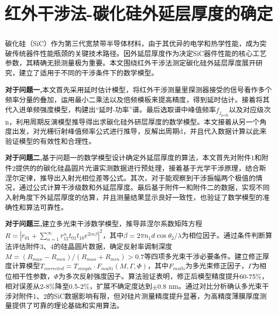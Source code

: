 \documentclass[withoutpreface,bwprint]{cumcmthesis}
\title{红外干涉法-碳化硅外延层厚度的确定}  %
\begin{document}
\maketitle
\begin{abstract}
碳化硅（SiC）作为第三代宽禁带半导体材料，由于其优异的电学和热学性能，成为突破传统器件性能瓶颈的关键技术路径。因外延层厚度作为决定SiC器件性能的核心工艺参数，其精确无损测量极为重要。本文围绕红外干涉法测定碳化硅外延层厚度展开研究，建立了适用于不同的干涉条件下的数学模型。

\textbf{对于问题一,}本文首先采用延时估计模型，将红外干涉测量里探测器接受的信号看作多个频率分量的叠加，运用最小二乘法以及倍频模板来提高精度，得到延时估计。接着将其代入进单频强度模型，构建出“延时-功率”谱。最后选取谱中峰值频率$f_{j_{\mathrm{peak}}}$以及对应级次n，利用周期反演模型推导得出求碳化硅外研层厚度的数学模型。本文接着从另一个角度出发，对光栅衍射峰值频率公式进行推导，反解出周期d，并且代入数据计算以此来验证模型的有效性和合理性。

\textbf{对于问题二,}基于问题一的数学模型设计确定外延层厚度的算法，本文首先对附件1和附件2提供的的碳化硅晶圆片光谱实测数据进行预处理，接着基于光学干涉原理，结合斯涅尔定律，推导出入射光相位差等公式。其次，对于能观察到干涉振幅两个极值的情况，通过公式计算干涉级数和外延层厚度。最后基于附件一和附件二的数据，实现不同入射角度下外延层厚度的估算，并且测量结果显示良好一致性，也验证了数学模型的准确性和算法可靠性。

\textbf{对于问题三,}建立多光束干涉数学模型，推导菲涅尔系数矩阵方程$R = |r_{01} + \sum_{n=1}^{\infty} r_{12}^n t_{01}t_{10} e^{2in\beta}|^2$，其中$\beta = 2\pi n_1 d \cos\theta_2/\lambda$为相位因子。通过条件判断算法评估附件3、4的硅晶圆片数据，确定反射率调制深度$M = (R_{max}-R_{min})/(R_{max}+R_{min}) > 0.7$等四项多光束干涉必要条件。建立修正厚度计算模型$T_{corrected} = T_{simple} \cdot F_{multi}(M, \Gamma, \Phi)$，其中$F_{multi}$为多光束修正因子，$\Gamma$为相位相干性参数，$\Phi$为多次反射强度因子。算法验证表明，修正后模型精度提升60-75\%，相对误差从2-8\%降至0.5-2\%，扩展不确定度达到$\pm 0.8$ nm。通过对比分析确认多光束干涉对附件1、2的SiC数据影响有限，但对硅片测量精度提升显著，为高精度薄膜厚度测量提供了可靠的理论基础和实用算法。

\textbf{}

\end{abstract}

\end{document}
